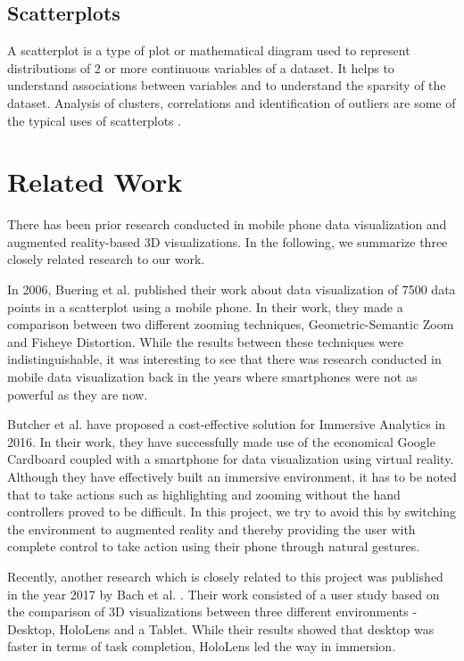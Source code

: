 \documentclass[journal]{vgtc}                %
\begin{document}
\subsection{Scatterplots}
A scatterplot is a type of plot or mathematical diagram used to represent distributions of 2 or more continuous variables of a dataset. It helps to understand associations between variables and to understand the sparsity of the dataset. Analysis of clusters, correlations and identification of outliers are some of the typical uses of scatterplots \cite{Tufte1983}.

\section{Related Work}

There has been prior research conducted in mobile phone data visualization and augmented reality-based 3D visualizations. In the following, we summarize three closely related research to our work.

In 2006, Buering et al. \cite{buering2006user} published their work about data visualization of 7500 data points in a scatterplot using a mobile phone. In their work, they made a comparison between two different zooming techniques, Geometric-Semantic Zoom and Fisheye Distortion. While the results between these techniques were indistinguishable, it was interesting to see that there was research conducted in mobile data visualization back in the years where smartphones were not as powerful as they are now.

Butcher et al. \cite{butcher2016immersive} have proposed a cost-effective solution for Immersive Analytics in 2016. In their work, they have successfully made use of the economical Google Cardboard coupled with a smartphone for data visualization using virtual reality. Although they have effectively built an immersive environment, it has to be noted that to take actions such as highlighting and zooming without the hand controllers proved to be difficult. In this project, we try to avoid this by switching the environment to augmented reality and thereby providing the user with complete control to take action using their phone through natural gestures.

Recently, another research which is closely related to this project was published in the year 2017 by Bach et al. \cite{bach2017hologram}. Their work consisted of a user study based on the comparison of 3D visualizations between three different environments - Desktop, HoloLens and a Tablet. While their results showed that desktop was faster in terms of task completion, HoloLens led the way in immersion.
\end{document}

